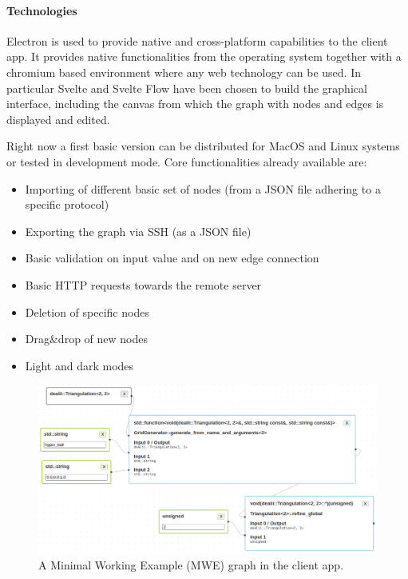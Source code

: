 \documentclass[a4paper,12pt]{article}
\begin{document}
\paragraph{Technologies}
Electron is used to provide native and cross-platform capabilities to the client app. It provides native functionalities from the operating system together with a chromium based environment where any web technology can be used. In particular Svelte and Svelte Flow have been chosen to build the graphical interface, including the canvas from which the graph with nodes and edges is displayed and edited.

Right now a first basic version can be distributed for MacOS and Linux systems or tested in development mode. Core functionalities already available are:
\begin{itemize}
  \item Importing of different basic set of nodes (from a JSON file adhering to a specific protocol)
  \item Exporting the graph via SSH (as a JSON file)
  \item Basic validation on input value and on new edge connection
  \item Basic HTTP requests towards the remote server
  \item Deletion of specific nodes
  \item Drag\&drop of new nodes
  \item Light and dark modes
\end{itemize}

\begin{figure}
  \centering

  \includegraphics[width=\textwidth]{dualistic-mwe.png}

  \caption{A Minimal Working Example (MWE)  graph in the client app.}
  \label{fig:dualistic-architecture}
\end{figure}
\end{document}
